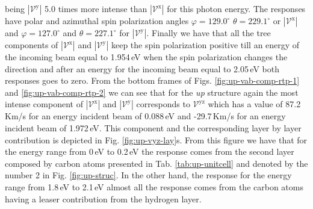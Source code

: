 \documentclass[prb,11pt,tightenlines,twocolumn,aps]{revtex4-1}
\begin{document}
% 
being $|\mathcal{V}^{\mathrm{y}}|$ 5.0 times more intense than
$|\mathcal{V}^{\mathrm{x}}|$ for this photon energy. The responses have polar
and azimuthal spin polarization angles $\varphi=129.0^{\circ}$
$\theta=229.1^{\circ}$ or $|\mathcal{V}^{\mathrm{x}}|$ and
$\varphi=127.0^{\circ}$ and $\theta= 227.1^{\circ}$ for
$|\mathcal{V}^{\mathrm{y}}|$.
% 
Finally we have that all the tree components of $|\mathcal{V}^{\mathrm{x}}|$ and
$|\mathcal{V}^{\mathrm{y}}|$ keep the spin polarization positive till an energy
of the incoming beam equal to 1.954\,eV when the spin polarization changes the
direction and after an energy for the incoming beam equal to 2.05\,eV both
responses goes to zero.
From the bottom frames of Figs. \ref{fig:up-vab-comp-rtp-1} and 
% 
\ref{fig:up-vab-comp-rtp-2} we can see that for the \emph{up} structure again
the most intense component of $|\mathcal{V}^{\mathrm{x}}|$ and
$|\mathcal{V}^{\mathrm{y}}|$ corresponds to $\mathcal{V}^{\mathrm{yz}}$ which
has a value of 87.2\,Km/s for an energy incident beam of 0.088\,eV and
-29.7\,Km/s for an energy incident beam of 1.972\,eV. This component and the
corresponding layer by layer contribution is depicted in Fig. 
\ref{fig:up-vyz-lay}s.
% 
From this figure we have that for the energy range from 0\,eV to 0.2\,eV the
response comes from the second layer composed by carbon atoms presented in Tab.
\ref{tab:up-unitcell} and denoted by the number 2 in Fig. \ref{fig:up-struc}. In
the other hand, the response for the energy range from 1.8\,eV to 2.1\,eV almost
all the response comes from the carbon atoms having a leaser contribution from
the hydrogen layer.



\end{document}
